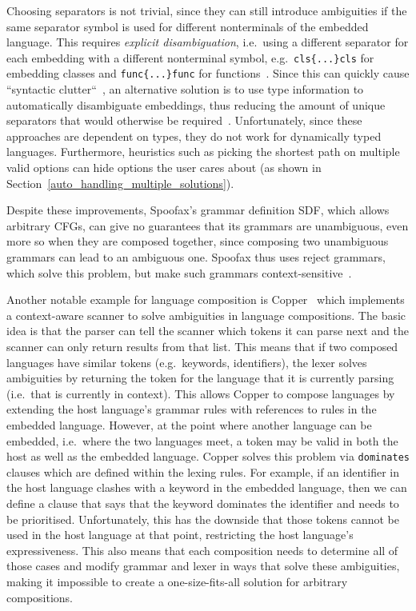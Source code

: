 \documentclass[sigplan,screen]{acmart}\settopmatter{printfolios=true,printccs=false,printacmref=false}
\begin{document}
Choosing separators is not trivial, since they can still introduce ambiguities
if the same separator symbol is used for different nonterminals of the embedded
language. This requires \textit{explicit disambiguation}, i.e.~using a
different separator for each embedding with a different nonterminal symbol,
e.g.~\verb|cls{...}cls| for embedding classes and \verb|func{...}func| for
functions~\cite{batory98jts}. Since this can
quickly cause ``syntactic clutter``~\cite[p.~4]{bravenboer05generalized},
an alternative solution is to use type information to automatically disambiguate
embeddings, thus reducing the amount of unique separators that would otherwise
be required~\cite{zook04generating, bravenboer05generalized}.
Unfortunately, since these approaches are dependent on types, they do not work
for dynamically typed languages. Furthermore, heuristics such as picking the
shortest path on multiple valid options can hide options the user cares about
(as shown in Section~\ref{auto_handling_multiple_solutions}).

Despite these improvements, Spoofax's grammar definition SDF,
which allows arbitrary CFGs, can give no guarantees that its grammars are unambiguous,
even more so when they are composed together, since composing two unambiguous grammars can lead to an ambiguous one.
Spoofax thus uses reject grammars, which solve this problem, but
make such grammars context-sensitive~\cite{eijck__lets_accept_rejects}.

Another notable example for language composition is Copper~\cite{wyk07context}
which implements a context-aware scanner to solve ambiguities in language
compositions. The basic idea is that the parser can tell the scanner which
tokens it can parse next and the scanner can only return results from that list.
This means that if two composed languages have similar tokens (e.g.~keywords,
identifiers), the lexer solves ambiguities
by returning the token for the language that it is currently parsing (i.e.~that is currently in context). This allows
Copper to compose languages by extending the host language's grammar rules
with references to rules in the embedded language. However, at the point where
another language can be embedded, i.e.~where the two languages meet, a token
may be valid in both the host as well as the embedded language.
Copper solves this problem
via \texttt{dominates} clauses which are defined within the lexing rules. For example, if an
identifier in the host language clashes with a keyword in the embedded language,
then we can define a clause that says that the keyword dominates the identifier
and needs to be prioritised. Unfortunately, this has the
downside that those tokens cannot be used in the host language at that point,
restricting the host language's expressiveness. This also means that each
composition needs to determine all of those cases and modify grammar and lexer in ways that solve
these ambiguities, making it impossible to create a one-size-fits-all solution for
arbitrary compositions.
\end{document}
